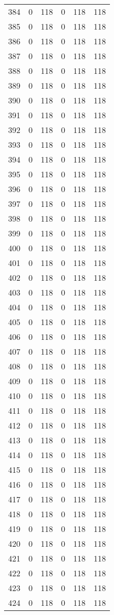 \documentclass[a4paper]{ctexart}
\begin{document}
\begin{longtable}{p{1cm}|p{2cm}|p{2cm}|p{2cm}|P{2cm}|p{2cm}}
		384&0&118&0&118&118\\
		385&0&118&0&118&118\\
		386&0&118&0&118&118\\
		387&0&118&0&118&118\\
		388&0&118&0&118&118\\
		389&0&118&0&118&118\\
		390&0&118&0&118&118\\
		391&0&118&0&118&118\\
		392&0&118&0&118&118\\
		393&0&118&0&118&118\\
		394&0&118&0&118&118\\
		395&0&118&0&118&118\\
		396&0&118&0&118&118\\
		397&0&118&0&118&118\\
		398&0&118&0&118&118\\
		399&0&118&0&118&118\\
		400&0&118&0&118&118\\
		401&0&118&0&118&118\\
		402&0&118&0&118&118\\
		403&0&118&0&118&118\\
		404&0&118&0&118&118\\
		405&0&118&0&118&118\\
		406&0&118&0&118&118\\
		407&0&118&0&118&118\\
		408&0&118&0&118&118\\
		409&0&118&0&118&118\\
		410&0&118&0&118&118\\
		411&0&118&0&118&118\\
		412&0&118&0&118&118\\
		413&0&118&0&118&118\\
		414&0&118&0&118&118\\
		415&0&118&0&118&118\\
		416&0&118&0&118&118\\
		417&0&118&0&118&118\\
		418&0&118&0&118&118\\
		419&0&118&0&118&118\\
		420&0&118&0&118&118\\
		421&0&118&0&118&118\\
		422&0&118&0&118&118\\
		423&0&118&0&118&118\\
		424&0&118&0&118&118\\

\end{longtable}
\end{document}
